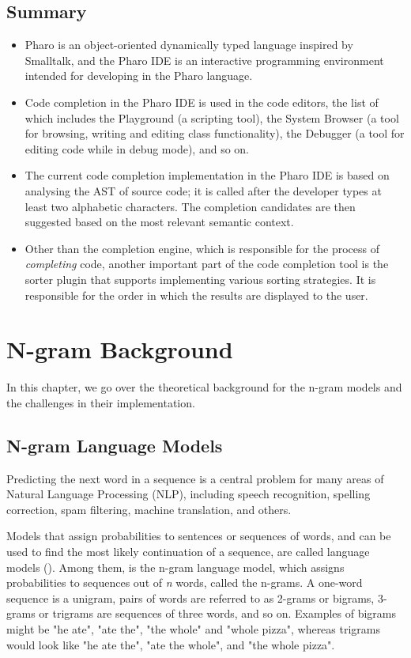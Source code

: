 \documentclass[sigplan,screen]{acmart}
\begin{document}
\subsection{Summary}
\begin{itemize}
    \item Pharo is an object-oriented dynamically typed language inspired by Smalltalk, and the Pharo IDE is an interactive programming environment intended for developing in the Pharo language.
    \item Code completion in the Pharo IDE is used in the code editors, the list of which includes the Playground (a scripting tool), the System Browser (a tool for browsing, writing and editing class functionality), the Debugger (a tool for editing code while in debug mode), and so on.
    \item The current code completion implementation in the Pharo IDE is based on analysing the AST of source code; it is called after the developer types at least two alphabetic characters. The completion candidates are then suggested based on the most relevant semantic context.
    \item Other than the completion engine, which is responsible for the process of \textit{completing} code, another important part of the code completion tool is the sorter plugin that supports implementing various sorting strategies. It is responsible for the order in which the results are displayed to the user.
\end{itemize}

\section{N-gram Background}
In this chapter, we go over the theoretical background for the n-gram models and the challenges in their implementation.

\subsection{N-gram Language Models}
Predicting the next word in a sequence is a central problem for many areas of Natural Language Processing (NLP), including speech recognition, spelling correction, spam filtering, machine translation, and others.

Models that assign probabilities to sentences or sequences of words, and can be used to find the most likely continuation of a sequence, are called language models (\cite{Jura09a}). Among them, is the n-gram language model, which assigns probabilities to sequences out of \textit{n} words, called the n-grams. A one-word sequence is a unigram, pairs of words are referred to as 2-grams or bigrams, 3-grams or trigrams are sequences of three words, and so on. Examples of bigrams might be "he ate", "ate the", "the whole" and "whole pizza", whereas trigrams would look like "he ate the", "ate the whole", and "the whole pizza".
\end{document}

